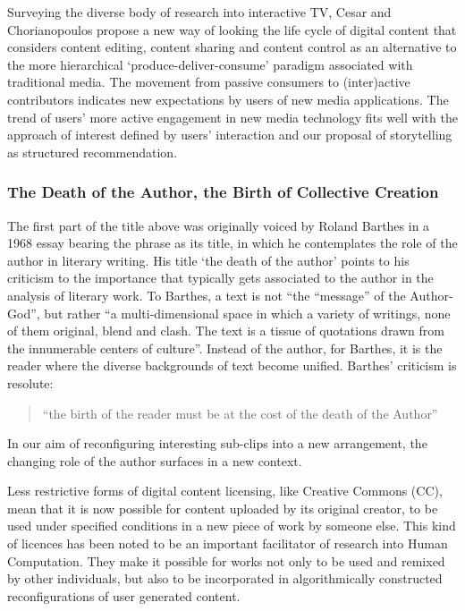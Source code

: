 Surveying the diverse body of research into interactive TV, Cesar and Chorianopoulos propose a new way of looking the life cycle of digital content that considers content editing, content sharing and content control as an alternative to the more hierarchical `produce-deliver-consume' paradigm associated with traditional media\cite{Cesar:2009fk}. The movement from passive consumers to (inter)active contributors indicates new expectations by users of new media applications. The trend of users' more active engagement in new media technology fits well with the approach of interest defined by users' interaction and our proposal of storytelling as structured recommendation.

\subsubsection{The Death of the Author, the Birth of Collective Creation}
The first part of the title above was originally voiced by Roland Barthes in a 1968 essay bearing the phrase as its title, in which he contemplates the role of the author in literary writing\cite{Barthes:1977wq}. His title `the death of the author' points to his criticism to the importance that typically gets associated to the author in the analysis of literary work. To Barthes, a text is not ``the “message” of the Author-God'', but rather ``a multi-dimensional space in which a variety of writings, none of them original, blend and clash. The text is a tissue of quotations drawn from the innumerable centers of culture''. Instead of the author, for Barthes, it is the reader where the diverse backgrounds of text become unified. Barthes' criticism is resolute:

\begin{quote}
  ``the birth of the reader must be at the cost of the death of the Author''
\end{quote}

In our aim of reconfiguring interesting sub-clips into a new arrangement, the changing role of the author surfaces in a new context.

Less restrictive forms of digital content licensing, like Creative Commons (CC), mean that it is now possible for content uploaded by its original creator, to be used under specified conditions in a new piece of work by someone else. This kind of licences has been noted to be an important facilitator of research into Human Computation\cite{Law:2009vl}. They make it possible for works not only to be used and remixed by other individuals, but also to be incorporated in algorithmically constructed reconfigurations of user generated content.

